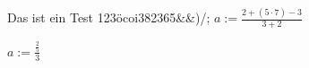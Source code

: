 % 
%
\usepackage{amsmath}

Das ist ein Test 123öcoi382365&&)/;
$a:=\frac{2+(5 \cdot 7)-3}{3+2}$

$a:=\frac{\frac{2}{5}}{3}$


